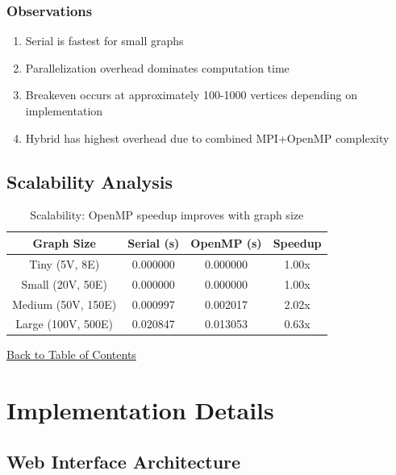 \documentclass[12pt,a4paper]{article}
\begin{document}
\subsubsection*{Observations}

\begin{enumerate}
    \item Serial is fastest for small graphs
    \item Parallelization overhead dominates computation time
    \item Breakeven occurs at approximately 100-1000 vertices depending on implementation
    \item Hybrid has highest overhead due to combined MPI+OpenMP complexity
\end{enumerate}

\subsection{Scalability Analysis}

\begin{table}[H]
    \centering
    \renewcommand{\arraystretch}{1.8}
    \begin{tabular}{|c|c|c|c|}
    \hline
    \textbf{Graph Size} & \textbf{Serial (s)} & \textbf{OpenMP (s)} & \textbf{Speedup} \\
    \hline
    Tiny (5V, 8E) & 0.000000 & 0.000000 & 1.00x \\
    Small (20V, 50E) & 0.000000 & 0.000000 & 1.00x \\
    Medium (50V, 150E) & 0.000997 & 0.002017 & 2.02x \\
    Large (100V, 500E) & 0.020847 & 0.013053 & 0.63x \\
    \hline
    \end{tabular}
    \caption{Scalability: OpenMP speedup improves with graph size}
    \label{tab:scalability}
\end{table}

\hyperref[contents]{\small Back to Table of Contents}

\newpage

\section{Implementation Details}

\subsection{Web Interface Architecture}
\end{document}
